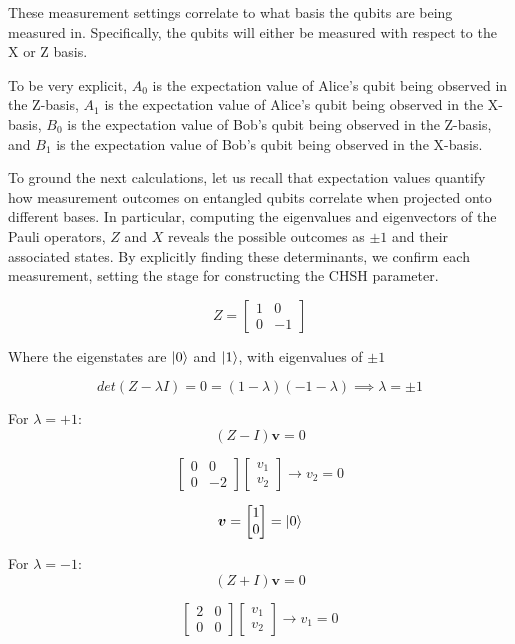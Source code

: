 \documentclass[12pt]{article}
\begin{document}
These measurement settings correlate to what basis the qubits are being measured in. Specifically, the qubits will either be measured with respect to the X or Z basis.

To be very explicit, $A_0$ is the expectation value of Alice's qubit being observed in the Z-basis, $A_1$ is the expectation value of Alice's qubit being observed in the X-basis, $B_0$ is the expectation value of Bob's qubit being observed in the Z-basis, and $B_1$ is the expectation value of Bob's qubit being observed in the X-basis.

To ground the next calculations, let us recall that expectation values quantify how measurement outcomes on entangled qubits correlate when projected onto different bases. In particular, computing the eigenvalues and eigenvectors of the Pauli operators, $Z$ and $X$ reveals the possible outcomes as $\pm 1$ and their associated states. By explicitly finding these determinants, we confirm each measurement, setting the stage for constructing the CHSH parameter. 

$$
Z = \begin{bmatrix}
1 & 0 \\
0 & -1
\end{bmatrix}
$$

Where the eigenstates are $\ket{0}$ and $\ket{1}$, with eigenvalues of $\pm1$

$$
det(Z-\lambda I) = 0 = (1-\lambda)(-1-\lambda) \implies \lambda = \pm 1
$$

For $\lambda = +1$:
$$
(Z-I)\boldsymbol{v} = 0 
$$

$$
\begin{bmatrix}
0 & 0 \\
0 & -2
\end{bmatrix}
\begin{bmatrix}
v_1 \\
v_2
\end{bmatrix} \rightarrow v_2 = 0
$$

$$
\boldsymbol{v} = \begin{bmatrix}
1 \\
0
\end{bmatrix} = \ket{0}
$$

For $\lambda = -1$:
$$
(Z+I)\boldsymbol{v} = 0 
$$

$$
\begin{bmatrix}
2 & 0 \\
0 & 0
\end{bmatrix}
\begin{bmatrix}
v_1 \\
v_2
\end{bmatrix} \rightarrow v_1 = 0
$$
\end{document}
